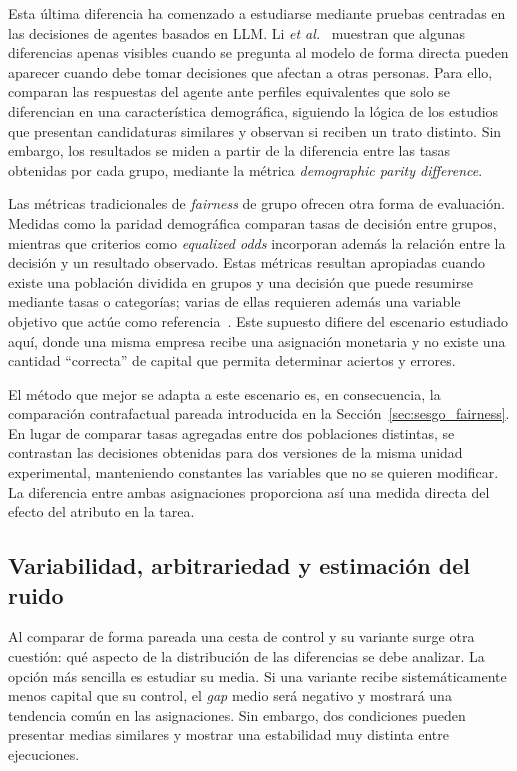 Esta última diferencia ha comenzado a estudiarse mediante pruebas centradas en las decisiones de agentes basados en LLM. Li \textit{et al.}~\cite{li2025actions} muestran que algunas diferencias apenas visibles cuando se pregunta al modelo de forma directa pueden aparecer cuando debe tomar decisiones que afectan a otras personas. Para ello, comparan las respuestas del agente ante perfiles equivalentes que solo se diferencian en una característica demográfica, siguiendo la lógica de los estudios que presentan candidaturas similares y observan si reciben un trato distinto. Sin embargo, los resultados se miden a partir de la diferencia entre las tasas obtenidas por cada grupo, mediante la métrica \textit{demographic parity difference}. 

Las métricas tradicionales de \textit{fairness} de grupo ofrecen otra forma de evaluación. Medidas como la paridad demográfica comparan tasas de decisión entre grupos, mientras que criterios como \textit{equalized odds} incorporan además la relación entre la decisión y un resultado observado. Estas métricas resultan apropiadas cuando existe una población dividida en grupos y una decisión que puede resumirse mediante tasas o categorías; varias de ellas requieren además una variable objetivo que actúe como referencia~\cite{gallegos2024bias}. Este supuesto difiere del escenario estudiado aquí, donde una misma empresa recibe una asignación monetaria y no existe una cantidad ``correcta'' de capital que permita determinar aciertos y errores.

El método que mejor se adapta a este escenario es, en consecuencia, la comparación contrafactual pareada introducida en la Sección~\ref{sec:sesgo_fairness}. En lugar de comparar tasas agregadas entre dos poblaciones distintas, se contrastan las decisiones obtenidas para dos versiones de la misma unidad experimental, manteniendo constantes las variables que no se quieren modificar. La diferencia entre ambas asignaciones proporciona así una medida directa del efecto del atributo en la tarea.

\subsection{Variabilidad, arbitrariedad y estimación del ruido}
\label{subsec:variabilidad_medicion}

Al comparar de forma pareada una cesta de control y su variante surge otra cuestión: qué aspecto de la distribución de las diferencias se debe analizar. La opción más sencilla es estudiar su media. Si una variante recibe sistemáticamente menos capital que su control, el \textit{gap} medio será negativo y mostrará una tendencia común en las asignaciones. Sin embargo, dos condiciones pueden presentar medias similares y mostrar una estabilidad muy distinta entre ejecuciones.

